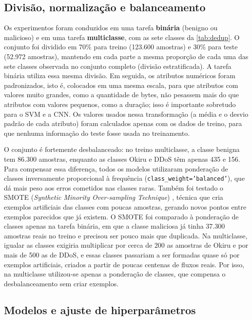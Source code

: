 \documentclass[alpha-refs,brazilian]{CC-EC_TF-TC}
\begin{document}
\subsection{Divisão, normalização e balanceamento}
\label{sec:divisao}

Os experimentos foram conduzidos em uma tarefa \textbf{binária} (benigno ou malicioso) e em uma tarefa \textbf{multiclasse}, com as sete classes da \autoref{tab:dedup}. O conjunto foi dividido em 70\% para treino (123.600 amostras) e 30\% para teste (52.972 amostras), mantendo em cada parte a mesma proporção de cada uma das sete classes observada no conjunto completo (divisão estratificada). A tarefa binária utiliza essa mesma divisão. Em seguida, os atributos numéricos foram padronizados, isto é, colocados em uma mesma escala, para que atributos com valores muito grandes, como a quantidade de bytes, não pesassem mais do que atributos com valores pequenos, como a duração; isso é importante sobretudo para o SVM e a CNN. Os valores usados nessa transformação (a média e o desvio padrão de cada atributo) foram calculados apenas com os dados de treino, para que nenhuma informação do teste fosse usada no treinamento.

O conjunto é fortemente desbalanceado: no treino multiclasse, a classe benigna tem 86.300 amostras, enquanto as classes Okiru e DDoS têm apenas 435 e 156. Para compensar essa diferença, todos os modelos utilizaram ponderação de classes inversamente proporcional à frequência (\texttt{class\_weight='balanced'}), que dá mais peso aos erros cometidos nas classes raras. Também foi testado o SMOTE (\textit{Synthetic Minority Over-sampling Technique}) \citep{chawla2002smote}, técnica que cria exemplos artificiais das classes com poucas amostras, gerando novos pontos entre exemplos parecidos que já existem. O SMOTE foi comparado à ponderação de classes apenas na tarefa binária, em que a classe maliciosa já tinha 37.300 amostras reais no treino e precisou ser pouco mais que duplicada. Na multiclasse, igualar as classes exigiria multiplicar por cerca de 200 as amostras de Okiru e por mais de 500 as de DDoS, e essas classes passariam a ser formadas quase só por exemplos artificiais, criados a partir de poucas centenas de fluxos reais. Por isso, na multiclasse utilizou-se apenas a ponderação de classes, que compensa o desbalanceamento sem criar exemplos.

\subsection{Modelos e ajuste de hiperparâmetros}
\label{sec:modelos}
\end{document}
